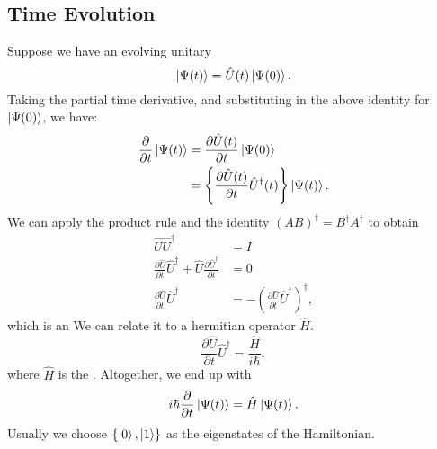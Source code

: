 \documentclass{article}
\numberwithin{equation}{section}
\begin{document}
\subsection{Time Evolution}
Suppose we have an evolving unitary
\begin{equation}
    \ket{\Psi(t)} = \hat{U}(t)\ket{\Psi(0)}.
\end{equation}
Taking the partial time derivative, and substituting in the above identity for $\ket{\Psi(0)}$, we have:
\begin{align*}
    \frac{\partial}{\partial t}\ket{\Psi(t)} &= \frac{\partial \hat{U}(t)}{\partial t} \ket{\Psi(0)} \\ 
    &= \left\{\frac{\partial \hat{U}(t)}{\partial t}\hat{U}^\dagger(t)\right\}\ket{\Psi(t)}.
\end{align*}
We can apply the product rule and the identity $(AB)^\dagger = B^\dagger A^\dagger$ to obtain
\begin{align*}
    \hat{U}\hat{U}^\dagger &= I \\ 
    \frac{\partial \hat{U}}{\partial t} \hat{U}^\dagger + \hat{U} \frac{\partial \hat{U}^\dagger}{\partial t} &= 0 \\ 
    \frac{\partial \hat{U}}{\partial t} \hat{U}^\dagger &= -\left(\frac{\partial \hat{U}}{\partial t} \hat{U}^\dagger\right)^\dagger,
\end{align*}
which is an  We can relate it to a hermitian operator $\hat{H}$.
\begin{equation}
    \frac{\partial \hat{U}}{\partial t} \hat{U}^\dagger = \frac{\hat{H}}{i\hbar},
\end{equation}
where $\hat{H}$ is the . Altogether, we end up with 
\begin{equation}
    i\hbar \frac{\partial}{\partial t}\ket{\Psi(t)} = \hat{H}\ket{\Psi(t)}.
\end{equation}
Usually we choose $\{\ket 0, \ket 1\}$ as the eigenstates of the Hamiltonian.
\end{document}
